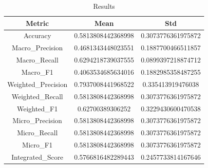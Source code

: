 \begin{table}[htbp]
\centering
\caption{Results}
\label{tab:csv}
\small
\setlength{\tabcolsep}{4pt}
\begin{tabular}{|c|c|c|}
\hline
Metric & Mean & Std \\
\hline
Accuracy & 0.5813808442368998 & 0.3073776361975872 \\
Macro_Precision & 0.4681343448023551 & 0.1887700466511857 \\
Macro_Recall & 0.6294218739037555 & 0.0899397218874712 \\
Macro_F1 & 0.4063534685634016 & 0.1882985358487255 \\
Weighted_Precision & 0.7937008441968522 & 0.335413919476038 \\
Weighted_Recall & 0.5813808442368998 & 0.3073776361975872 \\
Weighted_F1 & 0.62700389306252 & 0.3229430600470538 \\
Micro_Precision & 0.5813808442368998 & 0.3073776361975872 \\
Micro_Recall & 0.5813808442368998 & 0.3073776361975872 \\
Micro_F1 & 0.5813808442368998 & 0.3073776361975872 \\
Integrated_Score & 0.5766816482289443 & 0.2457733814167646 \\
\hline
\end{tabular}
\end{table}